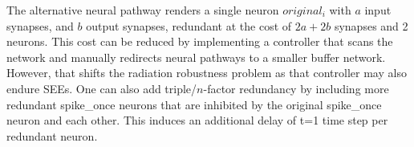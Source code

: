 \noindent The alternative neural pathway renders a single neuron $original_i$ with $a$ input synapses, and $b$ output synapses, redundant at the cost of $2a+2b$ synapses and 2 neurons. This cost can be reduced by implementing a controller that scans the network and manually redirects neural pathways to a smaller buffer network. However, that shifts the radiation robustness problem as that controller may also endure SEEs. %
One can also add triple/$n$-factor redundancy by including more redundant spike\_once neurons that are inhibited by the original spike\_once neuron and each other. This induces an additional delay of t=1 time step per redundant neuron.

